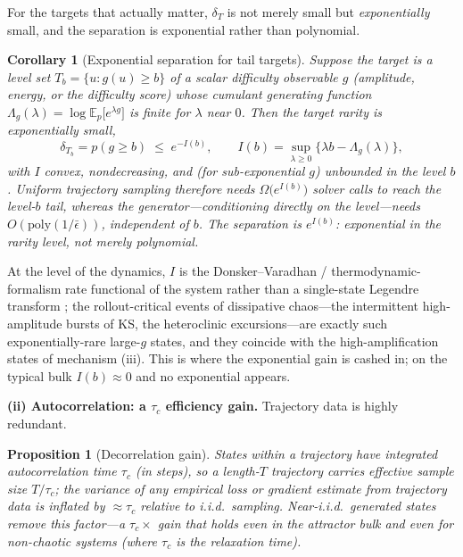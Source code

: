 \documentclass{article}
\theoremstyle{plain}
\newtheorem{proposition}{Proposition}
\newtheorem{corollary}{Corollary}
\theoremstyle{definition}
\theoremstyle{remark}
\newcommand{\E}{\mathbb{E}}
\newcommand{\state}{u}
\newcommand{\pnat}{p}
\begin{document}
For the targets that actually matter, $\delta_T$ is not merely small but \emph{exponentially} small, and the
separation is exponential rather than polynomial.
\begin{corollary}[Exponential separation for tail targets]\label{cor:ldp}
Suppose the target is a level set $T_b=\{\state:g(\state)\ge b\}$ of a scalar difficulty observable $g$
(amplitude, energy, or the difficulty score) whose cumulant generating function
$\Lambda_g(\lambda)=\log\E_{\pnat}\!\bigl[e^{\lambda g}\bigr]$ is finite for $\lambda$ near $0$. Then the
target rarity is exponentially small,
\[
  \delta_{T_b}=\pnat(g\ge b)\;\le\;e^{-I(b)},\qquad
  I(b)=\sup_{\lambda\ge0}\bigl\{\lambda b-\Lambda_g(\lambda)\bigr\},
\]
with $I$ convex, nondecreasing, and (for sub-exponential $g$) unbounded in the level $b$. Uniform trajectory
sampling therefore needs $\Omega\!\bigl(e^{I(b)}\bigr)$ solver calls to reach the level-$b$ tail, whereas the
generator---conditioning directly on the level---needs $O(\mathrm{poly}(1/\bar\epsilon))$, \emph{independent
of $b$}. The separation is $e^{I(b)}$: \emph{exponential in the rarity level}, not merely polynomial.
\end{corollary}
At the level of the dynamics, $I$ is the Donsker--Varadhan / thermodynamic-formalism rate functional of the
system rather than a single-state Legendre transform \citep{donsker1975asymptotic,dembo1998large}; the
rollout-critical events of dissipative chaos---the intermittent high-amplitude bursts of KS, the heteroclinic
excursions---are exactly such exponentially-rare large-$g$ states, and they coincide with the
high-amplification states of mechanism (iii). This is where the exponential gain is cashed in; on the typical
bulk $I(b)\approx0$ and no exponential appears.

\textbf{(ii) Autocorrelation: a $\tau_c$ efficiency gain.} Trajectory data is highly redundant.
\begin{proposition}[Decorrelation gain]\label{prop:decorrelation}
States within a trajectory have integrated autocorrelation time $\tau_c$ (in steps), so a length-$T$
trajectory carries effective sample size $T/\tau_c$; the variance of any empirical loss or gradient
estimate from trajectory data is inflated by $\approx\tau_c$ relative to i.i.d.\ sampling. Near-i.i.d.\
generated states remove this factor---a $\tau_c\times$ gain that holds even in the attractor bulk and even
for \emph{non-chaotic} systems (where $\tau_c$ is the relaxation time).
\end{proposition}
\end{document}
